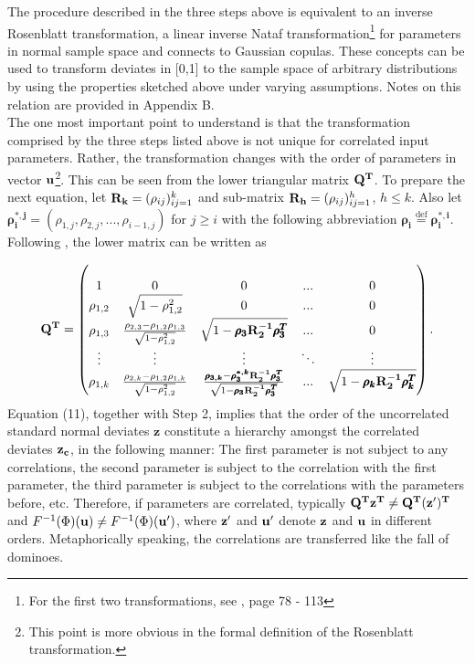 \documentclass[a4paper,12pt]{article}
\newcommand*{\defeq}{\stackrel{\text{def}}{=}}
\begin{document}
\noindent
The procedure described in the three steps above is equivalent to an inverse Rosenblatt transformation, a linear inverse Nataf transformation\footnote{For the first two transformations, see \cite{lemaire2013structural}, page 78 - 113} for parameters in normal sample space and connects to Gaussian copulas. These concepts can be used to transform deviates in [0,1] to the sample space of arbitrary distributions by using the properties sketched above under varying assumptions. Notes on this relation are provided in Appendix B.\\

\noindent
The one most important point to understand is that the transformation comprised by the three steps listed above is not unique for correlated input parameters. Rather, the transformation changes with the order of parameters in vector $\bold{u}$\footnote{This point is more obvious in the formal definition of the Rosenblatt transformation.}. This can be seen from the lower triangular matrix $\bold{Q^T}$. To prepare the next equation, let $\bold{R_k} = (\rho_{ij})_{ij=1}^k$ and sub-matrix $\bold{R_h} = (\rho_{ij})_{ij=1}^h$, $h \leq k$. Also let $\pmb{\rho_i^{*,j}} = (\rho_{1,j}, \rho_{2,j}, ..., \rho_{i-1,j})$ for $j \geq i$ with the following abbreviation $\pmb{\rho_i}\defeq\pmb{\rho_i^{*,i}}$. Following \cite{madar2015direct}, the lower matrix can be written as

\begin{align}
\bold{Q^T} =
\begin{pmatrix}
\\ 1 & 0 & 0 & ... & 0
\\\rho_{1,2} & \sqrt{1-\rho_{1,2}^2} & 0 & ... & 0
\\ \rho_{1,3} & \frac{\rho_{2,3}-\rho_{1,2}\rho_{1,3}}{\sqrt{1-\rho_{1,2}^2}} & \sqrt{1-\pmb{\rho_{3}}\bold{R^{-1}_2}\pmb{\rho_{3}^T}} & ... & 0
\\\vdots & \vdots & \vdots & 	\ddots & \vdots
\\ \rho_{1,k} &\frac{\rho_{2,k}-\rho_{1,2}\rho_{1,k}}{\sqrt{1-\rho_{1,2}^2}} & \frac{\pmb{\rho_{3,k}}-\pmb{\rho_{3}^{*,k}}\bold{R^{-1}_2}\pmb{\rho_{3}^T}}{\sqrt{1-\pmb{\rho_{3}}\bold{R^{-1}_2}\pmb{\rho_{3}^T}}}  &
... & \sqrt{1-\pmb{\rho_{k}}\bold{R^{-1}_2}\pmb{\rho_{k}^T}}
\end{pmatrix}.
\end{align}
Equation (11), together with Step 2, implies that the order of the uncorrelated standard normal deviates $\pmb{z}$ constitute a hierarchy amongst the correlated deviates $\bold{z_c}$, in the following manner: The first parameter is not subject to any correlations, the second parameter is subject to the correlation with the first parameter, the third parameter is subject to the correlations with the parameters before, etc. Therefore, if parameters are correlated, typically $\bold{Q^T z^T} \neq \bold{Q^T (z')^T}$ and $F^{-1}(\Phi)(\bold{u}) \neq F^{-1}(\Phi)(\bold{u'})$, where $\bold{z'}$ and $\bold{u'}$ denote $\bold{z}$ and $\bold{u}$ in different orders. Metaphorically speaking, the correlations are transferred like the fall of dominoes.
\end{document}

